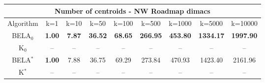 \begin{tabular}{c|cccccccc}\toprule
\multicolumn{9}{c}{Number of centroids - NW Roadmap dimacs}\\ \midrule
Algorithm & k=1 & k=10 & k=50 & k=100 & k=500 & k=1000 & k=5000 & k=10000 \\ \midrule
BELA$_0$ & \textbf{1.00} & \textbf{7.87} & \textbf{36.52} & \textbf{68.65} & \textbf{266.95} & \textbf{453.80} & \textbf{1334.17} & \textbf{1997.90} \\
K$_0$ & -- & -- & -- & -- & -- & -- & -- & -- \\
BELA$^*$ & \textbf{1.00} & 7.88 & 36.75 & 69.29 & 273.84 & 470.93 & 1423.40 & 2161.96 \\
K$^*$ & -- & -- & -- & -- & -- & -- & -- & -- \\ \bottomrule 
\end{tabular}

